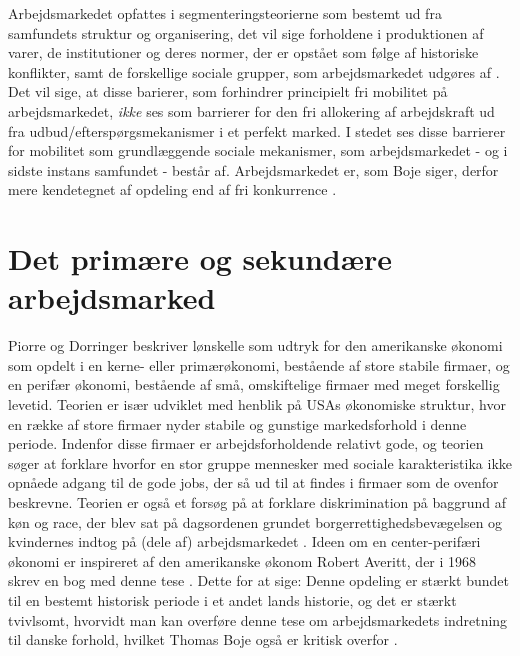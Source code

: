 Arbejdsmarkedet opfattes i segmenteringsteorierne som bestemt ud fra samfundets struktur og organisering, det vil sige forholdene i produktionen af varer, de institutioner og deres normer, der er opstået som følge af historiske konflikter, samt de forskellige sociale grupper, som arbejdsmarkedet udgøres af \parencite[9]{Boje1985}. Det  vil sige, at disse barierer, som forhindrer principielt fri mobilitet på arbejdsmarkedet, \emph{ikke} ses som barrierer for den fri allokering af arbejdskraft ud fra udbud/efterspørgsmekanismer i et perfekt marked. I stedet ses disse barrierer for mobilitet som grundlæggende sociale mekanismer, som arbejdsmarkedet - og i sidste instans samfundet - består af. Arbejdsmarkedet er, som Boje siger, derfor mere kendetegnet af opdeling end af fri konkurrence \parencite[8]{Boje1985}. 



\section{Det primære og sekundære arbejdsmarked \label{AST_primsek}}


Piorre og Dorringer beskriver lønskelle som udtryk for den amerikanske økonomi som opdelt i en kerne- eller primærøkonomi, bestående af store stabile firmaer, og en perifær økonomi, bestående af små, omskiftelige firmaer med meget forskellig levetid. Teorien er især udviklet med henblik på USAs økonomiske struktur, hvor en række af store firmaer nyder stabile og gunstige markedsforhold i denne periode. Indenfor disse firmaer er arbejdsforholdende relativt gode, og teorien søger at forklare hvorfor en stor gruppe mennesker med sociale karakteristika ikke opnåede adgang til de gode jobs, der så ud til at findes i firmaer som de ovenfor beskrevne. Teorien er også et forsøg på at forklare diskrimination på baggrund af køn og race, der blev sat på dagsordenen grundet borgerrettighedsbevægelsen og kvindernes indtog på (dele af) arbejdsmarkedet \parencites[1216]{Cain1976}. Ideen om en center-perifæri økonomi er inspireret af den amerikanske økonom Robert Averitt, der i 1968 skrev en bog med denne tese \textcite{Averitt1968}. Dette for at sige: Denne opdeling er stærkt bundet til en bestemt historisk periode i et andet lands historie, og det er stærkt tvivlsomt, hvorvidt man kan overføre denne tese om arbejdsmarkedets indretning til danske forhold, hvilket Thomas Boje også er kritisk overfor \parencite[36]{Boje1985}. 

